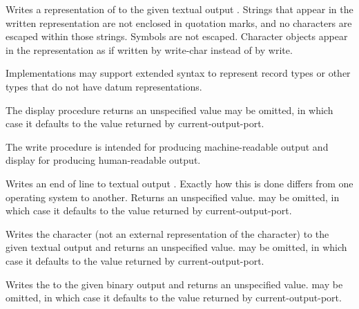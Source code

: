 \begin{entry}{%
}

Writes a representation of  to the given textual output .
Strings that appear in the written representation are not enclosed in
quotation marks, and no characters are escaped within those strings.  
Symbols are not escaped.  Character
objects appear in the representation as if written by {\cf write-char}
instead of by {\cf write}.

Implementations may support extended syntax to represent record types or
other types that do not have datum representations.

The {\cf display} procedure returns an unspecified value
 may be omitted, in which case it defaults to the
value returned by {\cf current-output-port}.

\begin{rationale}
The {\cf write} procedure is intended
for producing mach\-ine-readable output and {\cf display} for producing
human-readable output.  
\end{rationale}
\end{entry}


\begin{entry}{%
}

Writes an end of line to textual output .  Exactly how this
is done differs
from one operating system to another.  Returns an unspecified value.
 may be omitted, in which case it defaults to the
value returned by {\cf current-output-port}.

\end{entry}


\begin{entry}{%
}

Writes the character  (not an external representation of the
character) to the given textual output  and returns an unspecified
value.  
 may be omitted, in which case it defaults to the value
returned by {\cf current-output-port}.

\end{entry}

\begin{entry}{%
}

Writes the  to
the given binary output  and returns an unspecified value.
 may be omitted, in which case it defaults to
the value returned by {\cf current-output-port}.

\end{entry}

